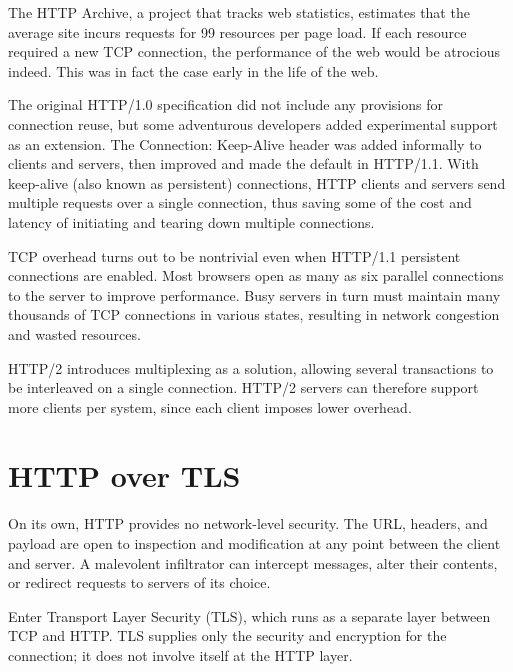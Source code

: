 The HTTP Archive, a project that tracks web statistics, estimates that
the average site incurs requests for 99 resources per page load. If each
resource required a new TCP connection, the performance of the web would
be atrocious indeed. This was in fact the case early in the life of the
web.

The original HTTP/1.0 specification did not include any provisions for
connection reuse, but some adventurous developers added experimental
support as an extension. The Connection:
\protect\hypertarget{part0027_split_005.htmlux5cux23_idIndexMarker2769}{}{}Keep-Alive
header was added informally to clients and servers, then improved and
made the default in HTTP/1.1. With keep-alive (also known as persistent)
connections, HTTP clients and servers send multiple requests over a
single connection, thus saving some of the cost and latency of
initiating and tearing down multiple connections.

TCP overhead turns out to be nontrivial even when HTTP/1.1 persistent
connections are enabled. Most browsers open as many as six parallel
connections to the server to improve performance. Busy servers in turn
must maintain many thousands of TCP connections in various states,
resulting in network congestion and wasted resources.

HTTP/2 introduces multiplexing as a solution, allowing several
transactions to be interleaved on a single connection. HTTP/2 servers
can therefore support more clients per system, since each client imposes
lower overhead.



\section{HTTP over TLS}

\protect\hypertarget{part0027_split_006.htmlux5cux23_idIndexMarker2770}{}{}On
its own, HTTP provides no network-level security. The URL, headers, and
payload are open to inspection and modification at any point between the
client and server. A malevolent infiltrator can intercept messages,
alter their contents, or redirect requests to servers of its choice.

Enter
\protect\hypertarget{part0027_split_006.htmlux5cux23_idIndexMarker2771}{}{}\protect\hypertarget{part0027_split_006.htmlux5cux23_idIndexMarker2772}{}{}\protect\hypertarget{part0027_split_006.htmlux5cux23_idIndexMarker2773}{}{}Transport
Layer Security (TLS), which runs as a separate layer between TCP and
HTTP. TLS supplies only the security and encryption for the connection;
it does not involve itself at the HTTP layer.

